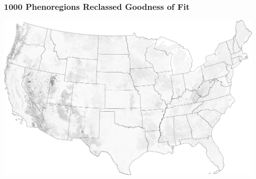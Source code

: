\begin{frame}
 \frametitle{1000 Phenoregions Reclassed Goodness of Fit}
 \includegraphics[width=\textwidth]{figures/phendump.2000-2012.1000.maxmode.reclassed.gof_gimp.pdf}
\end{frame}

